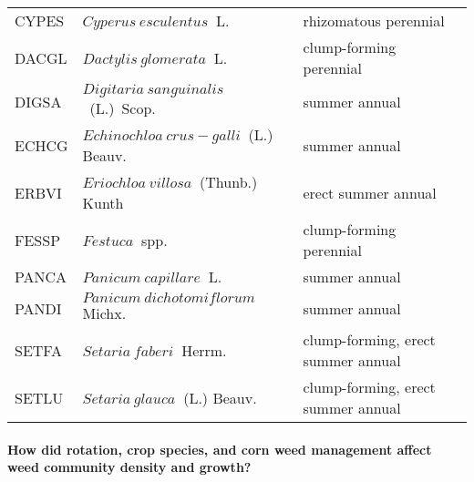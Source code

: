 \documentclass[
]{article}
\begin{document}
\begin{table}[H]
\begin{tabular}[t]{l|l|l}
\hspace{1em}CYPES & $Cyperus~esculentus$$~$ L. & rhizomatous perennial\\
 
\hspace{1em}DACGL & $Dactylis~glomerata$$~$ L. & clump-forming perennial\\
 
\hspace{1em}DIGSA & $Digitaria~sanguinalis$$~$~(L.)~Scop. & summer annual\\
 
\hspace{1em}ECHCG & $Echinochloa~crus-galli$$~$ (L.) Beauv. & summer annual\\
 
\hspace{1em}ERBVI & $Eriochloa~villosa$$~$ (Thunb.) Kunth & erect summer annual\\
 
\hspace{1em}FESSP & $Festuca$$~$ spp. & clump-forming perennial\\
 
\hspace{1em}PANCA & $Panicum~capillare$$~$ L. & summer annual\\
 
\hspace{1em}PANDI & $Panicum~dichotomiflorum$$~$Michx. & summer annual\\
 
\hspace{1em}SETFA & $Setaria~faberi$$~$ Herrm. & clump-forming, erect summer annual\\
 
\hspace{1em}SETLU & $Setaria~glauca$$~$ (L.) Beauv. & clump-forming, erect summer annual\\
\hline
\end{tabular}
\end{table}

\hypertarget{how-did-rotation-crop-species-and-corn-weed-management-affect-weed-community-density-and-growth}{%
\paragraph*{How did rotation, crop species, and corn weed management affect weed community density and growth?}\label{how-did-rotation-crop-species-and-corn-weed-management-affect-weed-community-density-and-growth}}
\end{document}
